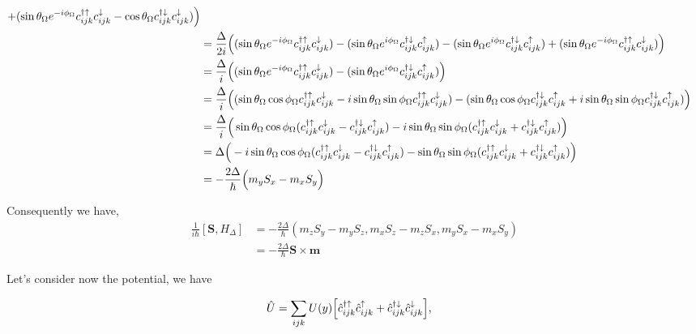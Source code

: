 \documentclass[10pt,prb,showpacs,amssymb,floatfix]{revtex4-1}
\newcommand{\dna}{\downarrow}
\newcommand{\nn}{\nonumber}
\newcommand{\upa}{\uparrow}
\newcommand{\up}{\uparrow}
\newcommand{\Dlt}{\Delta}
\newcommand{\Og}{\Omega}
\newcommand{\h}{\hat}
\begin{document}
\begin{align}
+ (\sin\theta_\Og e^{-i\phi_\Og} c_{ijk}^{\dagger \upa} c_{ijk}^\dna -  \cos\theta_\Og  c_{ijk}^{\dagger \dna} c_{ijk}^\dna )  \Big{)} \nn\\
& = \frac{\Dlt}{2i} \Big{(} (  \sin\theta_\Og e^{-i\phi_\Og} c_{ijk}^{\dagger \upa} c_{ijk}^\dna)
 - (   \sin\theta_\Og e^{i\phi_\Og} c_{ijk}^{\dagger \dna} c_{ijk}^\upa)  -  ( \sin\theta_\Og e^{i\phi_\Og} c_{ijk}^{\dagger \dna} c_{ijk}^\uparrow  ) 
+ (\sin\theta_\Og e^{-i\phi_\Og} c_{ijk}^{\dagger \upa} c_{ijk}^\dna  )  \Big{)} \nn\\
& = \frac{\Dlt}{i} \Big{(} (  \sin\theta_\Og e^{ -i\phi_\Og} c_{ijk}^{\dagger \upa} c_{ijk}^\dna)
 - (   \sin\theta_\Og e^{i\phi_\Og} c_{ijk}^{\dagger \dna} c_{ijk}^\upa)   \Big{)} \nn\\
 & = \frac{\Dlt}{i} \Big{(} (  \sin\theta_\Og \cos \phi_\Og  c_{ijk}^{\dagger \upa} c_{ijk}^\dna - i  \sin\theta_\Og \sin \phi_\Og  c_{ijk}^{\dagger \upa} c_{ijk}^\dna)
 - (   \sin\theta_\Og \cos \phi_\Og c_{ijk}^{\dagger \dna} c_{ijk}^\upa + i \sin\theta_\Og  \sin \phi_\Og c_{ijk}^{\dagger \dna} c_{ijk}^\upa)    \Big{)}  \nn\\
 & = \frac{\Dlt}{i} \Big{(}   \sin\theta_\Og \cos \phi_\Og  ( c_{ijk}^{\dagger \upa} c_{ijk}^\dna - c_{ijk}^{\dagger \dna} c_{ijk}^\up )  - i  \sin\theta_\Og \sin \phi_\Og  (c_{ijk}^{\dagger \upa} c_{ijk}^\dna + c_{ijk}^{\dagger \dna} c_{ijk}^\upa  )   \Big{)} \nn\\
 &= \Dlt \Big{(}   -i \sin\theta_\Og \cos \phi_\Og  ( c_{ijk}^{\dagger \upa} c_{ijk}^\dna - c_{ijk}^{\dagger \dna} c_{ijk}^\up )  -   \sin\theta_\Og \sin \phi_\Og  (c_{ijk}^{\dagger \upa} c_{ijk}^\dna + c_{ijk}^{\dagger \dna} c_{ijk}^\upa  )   \Big{)} \nn\\
 & =  -\frac{2 \Dlt}{\hbar} \Big{(}   m_y  S_x - m_x  S_y     \Big{)}
\end{align}

Consequently we have,
\begin{align}
\frac{1}{i\hbar}[\bm S, H_\Dlt] &= -\frac{2 \Dlt}{\hbar}( m_z S_y - m_y S_z  , m_x  S_z   - m_z  S_x ,m_y  S_x - m_x  S_y) \nn\\
&= -\frac{2 \Dlt}{\hbar} \bm S \times \bm m
\end{align}

Let's consider now the potential, we have

\begin{align}
\h U &= \sum_{ijk} U(y) \Big{[}  \hat{c}_{ijk}^{\dagger \upa} \hat{c}^{\upa}_{ijk} +   \hat{c}_{ijk}^{\dagger \dna} \hat{c}^{\dna}_{ijk} \Big{]}, 
\end{align}
\end{document}
